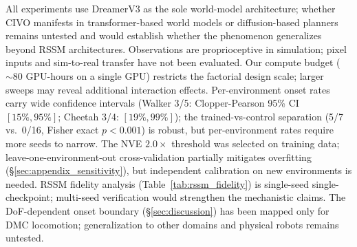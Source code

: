 All experiments use DreamerV3 as the sole world-model architecture; whether CIVO manifests in transformer-based world models \citep{micheli2023iris} or diffusion-based planners remains untested and would establish whether the phenomenon generalizes beyond RSSM architectures. Observations are proprioceptive in simulation; pixel inputs and sim-to-real transfer have not been evaluated. Our compute budget (${\sim}80$ GPU-hours on a single GPU) restricts the factorial design scale; larger sweeps may reveal additional interaction effects. Per-environment onset rates carry wide confidence intervals (Walker 3/5: Clopper-Pearson 95\% CI $[15\%, 95\%]$; Cheetah 3/4: $[19\%, 99\%]$); the trained-vs-control separation (5/7 vs.\ 0/16, Fisher exact $p < 0.001$) is robust, but per-environment rates require more seeds to narrow. The NVE $2.0\times$ threshold was selected on training data; leave-one-environment-out cross-validation partially mitigates overfitting (\S\ref{sec:appendix_sensitivity}), but independent calibration on new environments is needed. RSSM fidelity analysis (Table~\ref{tab:rssm_fidelity}) is single-seed single-checkpoint; multi-seed verification would strengthen the mechanistic claims. The DoF-dependent onset boundary (\S\ref{sec:discussion}) has been mapped only for DMC locomotion; generalization to other domains and physical robots remains untested.
